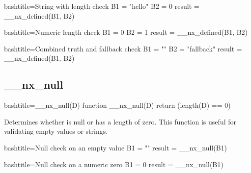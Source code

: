 \begin{NexCodeBox}{bash}{title={String with length check}}
	B1 = "hello"
	B2 = 0
	result = __nx_defined(B1, B2)
\end{NexCodeBox}

\begin{NexCodeBox}{bash}{title={Numeric length check}}
	B1 = 0
	B2 = 1
	result = __nx_defined(B1, B2)
\end{NexCodeBox}

\begin{NexCodeBox}{bash}{title={Combined truth and fallback check}}
	B1 = ""
	B2 = "fallback"
	result = __nx_defined(B1, B2)
\end{NexCodeBox}

\newpage
\subsection{__nx_null}
\label{__nx_null}
\begin{NexCodeBox}{bash}{title={__nx_null(D)}}
function __nx_null(D) {
	return (length(D) == 0)
}
\end{NexCodeBox}

\begin{NexMainBox}
	\begin{NexMainBox}
		Determines whether  is null or has a length of zero. This function is useful for validating empty values or strings.
	\end{NexMainBox}
	\begin{NexMainBox}
		\begin{NexListDark}
		\end{NexListDark}
	\end{NexMainBox}
\end{NexMainBox}

\begin{NexCodeBox}{bash}{title={Null check on an empty value}}
	B1 = ""
	result = __nx_null(B1)
\end{NexCodeBox}

\begin{NexCodeBox}{bash}{title={Null check on a numeric zero}}
	B1 = 0
	result = __nx_null(B1)
\end{NexCodeBox}

